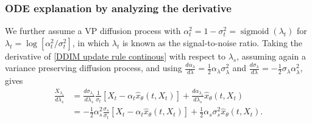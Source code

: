 \documentclass{article}
\theoremstyle{plain}
\theoremstyle{definition}
\theoremstyle{remark}
\begin{document}
\subsubsection{ODE explanation by analyzing the derivative}
We further assume a VP diffusion process with $\alpha_t^2=1-\sigma_t^2=\operatorname{sigmoid}\left(\lambda_t\right)$ for $\lambda_t=\log \left[\alpha_t^2 / \sigma_t^2\right]$, in which $\lambda_t$ is known as the signal-to-noise ratio. Taking the derivative of \eqref{DDIM update rule continous} with respect to $\lambda_s$, assuming again a variance preserving diffusion process, and using $\frac{d \alpha_\lambda}{d \lambda}=\frac{1}{2} \alpha_\lambda \sigma_\lambda^2$ and $\frac{d \sigma_\lambda}{d \lambda}=-\frac{1}{2} \sigma_\lambda \alpha_\lambda^2$, gives
$$
\begin{aligned}
\frac{X_{\lambda_s}}{d \lambda_s} & =\frac{d \sigma_{\lambda_s}}{d \lambda_s} \frac{1}{\sigma_t}\left[X_t-\alpha_t \hat{x}_\theta\left(t,X_t\right)\right]+\frac{d \alpha_{\lambda_s}}{d \lambda_s} \hat{x}_\theta\left(t,X_t\right) \\
& =-\frac{1}{2} \alpha_s^2 \frac{\sigma_s}{\sigma_t}\left[X_t-\alpha_t \hat{x}_\theta\left(t,X_t\right)\right]+\frac{1}{2} \alpha_s \sigma_s^2 \hat{x}_\theta\left(t,X_t\right) .
\end{aligned}
$$
\end{document}
